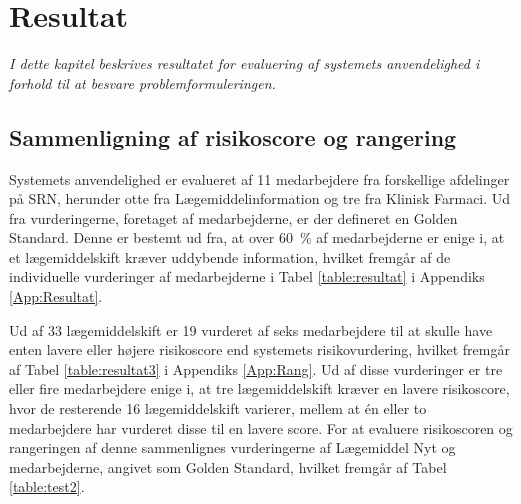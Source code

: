 \chapter{Resultat}
\textit{I dette kapitel beskrives resultatet for evaluering af systemets anvendelighed i forhold til at besvare problemformuleringen.}

\section{Sammenligning af risikoscore og rangering}
Systemets anvendelighed er evalueret af 11 medarbejdere fra forskellige afdelinger på SRN, herunder otte fra Lægemiddelinformation og tre fra Klinisk Farmaci. Ud fra vurderingerne, foretaget af medarbejderne, er der defineret en Golden Standard. Denne er bestemt ud fra, at over 60~\% af medarbejderne er enige i, at et lægemiddelskift kræver uddybende information, hvilket fremgår af de individuelle vurderinger af medarbejderne i Tabel \ref{table:resultat} i Appendiks \ref{App:Resultat}.

Ud af 33 lægemiddelskift er 19 vurderet af seks medarbejdere til at skulle have enten lavere eller højere risikoscore end systemets risikovurdering, hvilket fremgår af Tabel \ref{table:resultat3} i Appendiks \ref{App:Rang}. Ud af disse vurderinger er tre eller fire medarbejdere enige i, at tre lægemiddelskift kræver en lavere risikoscore, hvor de resterende 16 lægemiddelskift varierer, mellem at én eller to medarbejdere har vurderet disse til en lavere score. %
For at evaluere risikoscoren og rangeringen af denne sammenlignes vurderingerne af Lægemiddel Nyt og medarbejderne, angivet som Golden Standard, hvilket fremgår af Tabel \ref{table:test2}. 

